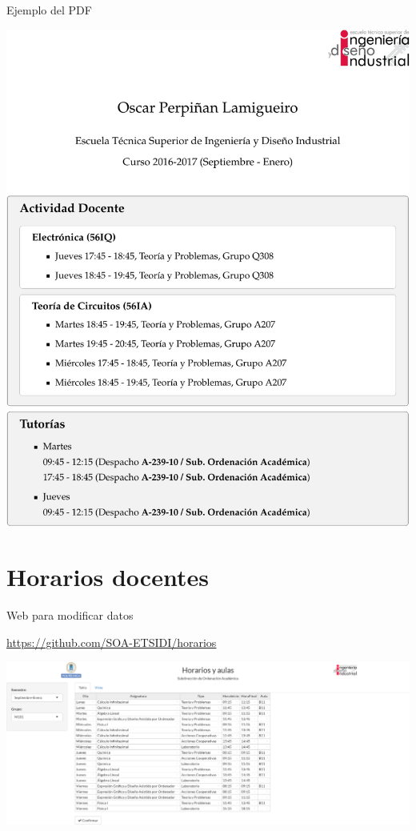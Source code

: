 \documentclass[spanish, xcolor={usenames,svgnames,dvipsnames}]{beamer}
\begin{document}
\begin{frame}[label={sec:org1c8ce06}]{Ejemplo del PDF}
\begin{center}
\includegraphics[width=.9\linewidth]{images/tutorias_OPL.pdf}
\end{center}
\end{frame}


\section{Horarios docentes}
\label{sec:org8b723fe}

\begin{frame}[label={sec:org141bd02}]{Web para modificar datos}
\begin{block}{}
\url{https://github.com/SOA-ETSIDI/horarios}

\begin{center}
\includegraphics[width=.9\linewidth]{images/horarios.png}
\end{center}
\end{block}
\end{frame}
\end{document}
